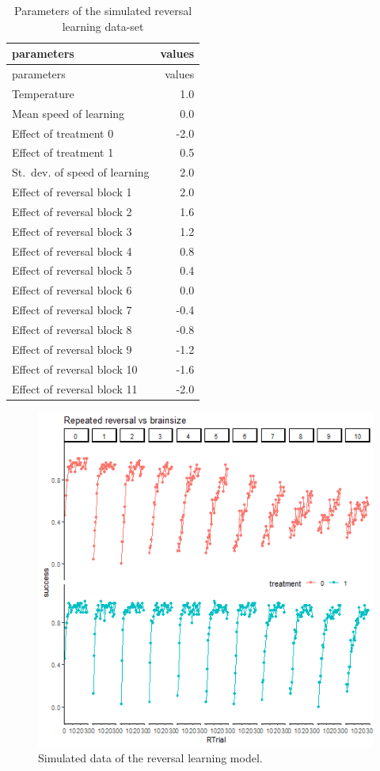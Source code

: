 \documentclass[
]{article}
\begin{document}
\begin{longtable}[]{@{}lr@{}}
\caption{\label{tab:param_rev_meta} Parameters of the simulated reversal
learning data-set}\tabularnewline
\toprule\noalign{}
parameters & values \\
\midrule\noalign{}
\endfirsthead
\toprule\noalign{}
parameters & values \\
\midrule\noalign{}
\endhead
\bottomrule\noalign{}
\endlastfoot
Temperature & 1.0 \\
Mean speed of learning & 0.0 \\
Effect of treatment 0 & -2.0 \\
Effect of treatment 1 & 0.5 \\
St.~dev. of speed of learning & 2.0 \\
Effect of reversal block 1 & 2.0 \\
Effect of reversal block 2 & 1.6 \\
Effect of reversal block 3 & 1.2 \\
Effect of reversal block 4 & 0.8 \\
Effect of reversal block 5 & 0.4 \\
Effect of reversal block 6 & 0.0 \\
Effect of reversal block 7 & -0.4 \\
Effect of reversal block 8 & -0.8 \\
Effect of reversal block 9 & -1.2 \\
Effect of reversal block 10 & -1.6 \\
Effect of reversal block 11 & -2.0 \\
\end{longtable}

\begin{figure}

\includegraphics{reversal_data_sim_block} \hfill{}

\caption{Simulated data of the reversal learning model.}\label{fig:rev_sim_data_block}
\end{figure}
\end{document}
